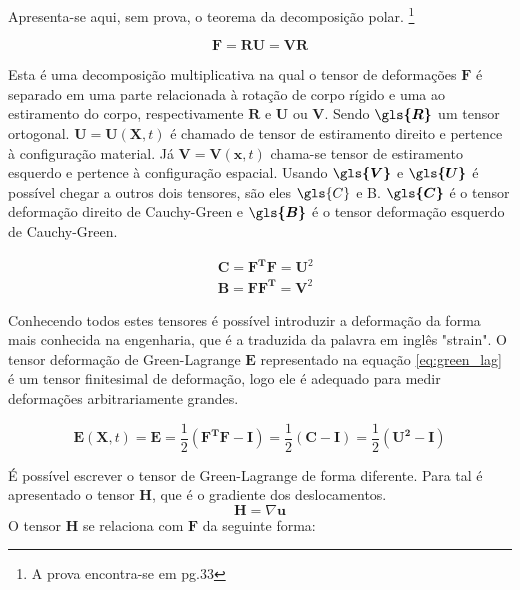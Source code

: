 Apresenta-se aqui, sem prova, o teorema da decomposição polar. \footnote{A prova encontra-se em \cite{gurtin_fried_anand_2013} pg.33}

\begin{equation}
    \boldsymbol F = \boldsymbol{RU} = \boldsymbol{VR}
\end{equation}

Esta é uma decomposição multiplicativa na qual o tensor de deformações $ \boldsymbol{F} $ é separado em uma parte relacionada à rotação de corpo rígido e uma ao estiramento do corpo, respectivamente $ \boldsymbol{R} $ e $ \boldsymbol{U} $ ou $ \boldsymbol{V} $. Sendo $ \boldsymbol{\gls{R}}$ um tensor ortogonal. $ \boldsymbol U = \boldsymbol{U}(\boldsymbol{X},t) $ é chamado de tensor de estiramento direito e pertence à configuração material. Já $ \boldsymbol V = \boldsymbol{V}(\boldsymbol{x},t) $ chama-se tensor de estiramento esquerdo e pertence à configuração espacial. Usando $ \boldsymbol{\gls{V}} $  e $ \boldsymbol{\gls{U}} $ é possível chegar a outros dois tensores, são eles $ \gls{C}$ e \gls{B}. $ \boldsymbol{\gls{C}} $ é o tensor deformação direito de Cauchy-Green e $ \boldsymbol{\gls{B}} $ é o tensor deformação esquerdo de Cauchy-Green. 

\begin{align}
    & \boldsymbol{C} = \boldsymbol{F^TF} = \boldsymbol{U}^2 \\
    & \boldsymbol{B} = \boldsymbol{FF^T} = \boldsymbol{V}^2
\end{align}

Conhecendo todos estes tensores é possível introduzir a deformação da forma mais conhecida na engenharia, que é a traduzida da palavra em inglês "strain". O tensor deformação de Green-Lagrange $ \boldsymbol{E} $ representado na equação \ref{eq:green_lag} é um tensor finitesimal de deformação, logo ele é adequado para medir deformações arbitrariamente grandes.

\begin{equation}
   \boldsymbol{E}(\boldsymbol{X},t) =  \boldsymbol{E} = \frac{1}{2}(\boldsymbol{F^TF - I}) = \frac{1}{2}(\boldsymbol{C - I}) = \frac{1}{2}(\boldsymbol{U^2 - I})
    \label{eq:green_lag}
\end{equation}

É possível escrever o tensor de Green-Lagrange de forma diferente. Para tal é apresentado o tensor $\boldsymbol{H}$, que é o gradiente dos deslocamentos.
\begin{equation}
    \boldsymbol{H} = \nabla \boldsymbol{u}
    \label{eq:desl_gradH}
\end{equation}
O tensor $ \boldsymbol{H} $ se relaciona com $ \boldsymbol{F} $ da seguinte forma:


